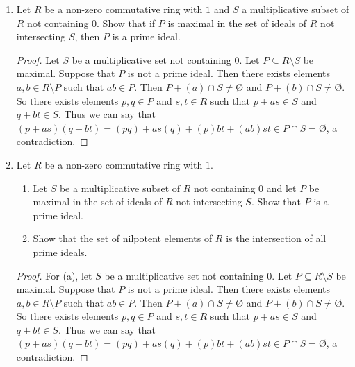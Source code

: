\documentclass{article}
\theoremstyle{definition}
\newcommand{\es}{\text{\O}}
\begin{document}
\begin{enumerate}
\begin{proof}
                Let $u\in U$. Then $u=cy$ for some $y\in R$. Then $y\in V$. So we can say that $y=dz$ for some $z\in R$. Thus $u=c(dz)$ and so $u\in (cd)$. Hence $U\subseteq (cd)$. Also since $d\in V$ then $cd\in U$ and so $(cd)\subseteq U$. But then we have $U=(cd)$, a contradiction and so $U$ is a prime ideal. 
            \end{proof}

            \item Let $R$ be a non-zero commutative ring with $1$ and $S$ a multiplicative subset of $R$ not containing $0$. Show that if $P$ is maximal in the set of ideals of $R$ not intersecting $S$, then $P$ is a prime ideal.
            
            \begin{proof}
                Let $S$ be a multiplicative set not containing $0$. Let $P\subseteq R\setminus S$ be maximal. Suppose that $P$ is not a prime ideal. Then there exists elements $a,b\in R\setminus P$ such that $ab\in P$. Then $P+(a)\cap S \neq \es$ and $P+(b)\cap S \neq \es$. So there exists elements $p,q\in P$ and $s,t\in R$ such that $p+as\in S$ and $q+bt\in S$. Thus we can say that $(p+as)(q+bt)=(pq)+as(q)+(p)bt+(ab)st\in P\cap S=\es $, a contradiction.
            \end{proof}

            \item Let $R$ be a non-zero commutative ring with $1$. 
                
                \begin{enumerate}
                    \item Let $S$ be a multiplicative subset of $R$ not containing $0$ and let $P$ be maximal in the set of ideals of $R$ not intersecting $S$. Show that $P$ is a prime ideal.
                    \item Show that the set of nilpotent elements of $R$ is the intersection of all prime ideals.
                \end{enumerate}
            
            \begin{proof}
                For (a), let $S$ be a multiplicative set not containing $0$. Let $P\subseteq R\setminus S$ be maximal. Suppose that $P$ is not a prime ideal. Then there exists elements $a,b\in R\setminus P$ such that $ab\in P$. Then $P+(a)\cap S \neq \es$ and $P+(b)\cap S \neq \es$. So there exists elements $p,q\in P$ and $s,t\in R$ such that $p+as\in S$ and $q+bt\in S$. Thus we can say that $(p+as)(q+bt)=(pq)+as(q)+(p)bt+(ab)st\in P\cap S=\es $, a contradiction.


\end{proof}
\end{enumerate}
\end{document}

